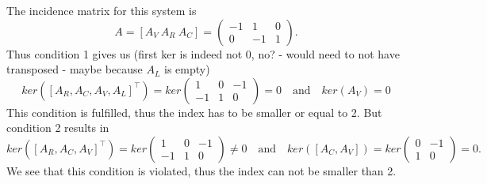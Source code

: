 	The incidence matrix for this system is
	\begin{displaymath}
		A = [A_V~A_R~A_C] = 
		\left(
		\begin{matrix}
			-1 & 1 & 0 \\
			0 & -1 & 1 
		\end{matrix}
		\right).
	\end{displaymath} 
	Thus condition 1 gives us (first ker is indeed not 0, no? - would need to not have transposed - maybe because $A_L$ is empty)
	\begin{displaymath}
		ker([A_R, A_C, A_V, A_L]^\top) = ker
		\left(
		\begin{matrix}
			 1 & 0 & -1\\
			-1 & 1 & 0
		\end{matrix}
		\right) = 0 
		\quad \text{and} \quad 
		ker(A_V) = 0
	\end{displaymath}
	This condition is fulfilled, thus the index has to be smaller or equal to 2.
	But condition 2 results in
	\begin{displaymath}
		ker([A_R, A_C, A_V]^\top) = ker\left(
		\begin{matrix}
			1 & 0 & -1\\
			-1 & 1 & 0
		\end{matrix}
		\right) \neq 0
		\quad \text{and} \quad
		ker([A_C, A_V]) = ker
		\left(
		\begin{matrix}
			0 & -1\\
			1 & 0
		\end{matrix}
		\right) = 0.
	\end{displaymath}
	We see that this condition is violated, thus the index can not be smaller than 2.
	
